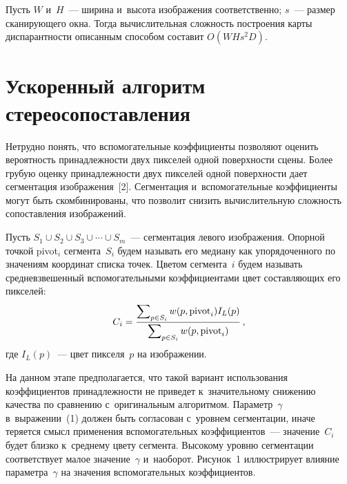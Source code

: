 \begin{multicols}{2}
  Пусть $W$ и~$H$~--- ширина и~высота изображения соответственно; $s$~--- 
размер сканирующего окна. Тогда вычислительная сложность построения карты 
диспарантности описанным способом составит $O(W  H  s^2 D)$.

\section{Ускоренный алгоритм стереосопоставления}

  Нетрудно понять, что вспомогательные коэффициенты позволяют оценить 
вероятность принадлежности двух пикселей одной поверхности сцены. Более 
грубую оценку принадлежности двух пикселей одной поверхности дает 
сегментация изображения~[2]. Сегментация и~вспомогательные коэффициенты 
могут быть скомбинированы, что позволит снизить вычислительную сложность 
сопоставления изображений.
  
  Пусть $S_1\cup S_2\cup S_3\cup\cdots \cup S_m$~--- сегментация левого 
изображения. Опорной точкой pivot$_i$ сегмента~$S_i$ будем называть его 
медиану как упорядоченного по значениям координат списка точек. Цветом 
сегмента~$i$ будем называть средневзвешенный вспомогательными 
коэффициентами цвет составляющих его пикселей:
  $$
  C_i= \displaystyle\frac{\displaystyle \sum\nolimits_{p\in S_i} w(p,\mathrm{pivot}_i) I_L(p)\mathstrut}{\displaystyle \sum\nolimits_{p\in S_i} 
w(p,\mathrm{pivot}_i)\mathstrut}\,,
  $$
  где $I_L(p)$~--- цвет пикселя~$p$  на изображении.
  
  На данном этапе предполагается, что такой вариант использования 
коэффициентов принадлежности не приведет к~значительному снижению 
качества по сравнению с~оригинальным алгоритмом. Параметр~$\gamma$ 
в~выражении~(1) должен быть согласован с~уровнем сегментации, иначе 
теряется смысл применения вспомогательных коэффициентов~--- 
значение~$C_i$ будет близко к~среднему цвету сегмента. Высокому уровню 
сегментации соответствует малое значение~$\gamma$ и~наоборот. Рисунок~1 
иллюстрирует влияние параметра~$\gamma$ на значения вспомогательных 
коэффициентов.
  
  
  \begin{figure*} %
  \vspace*{1pt}
 \begin{center}  
\mbox{%
 \epsfxsize=115mm
 }
\end{center} 
\vspace*{-9pt}
\end{figure*}


\end{multicols}
